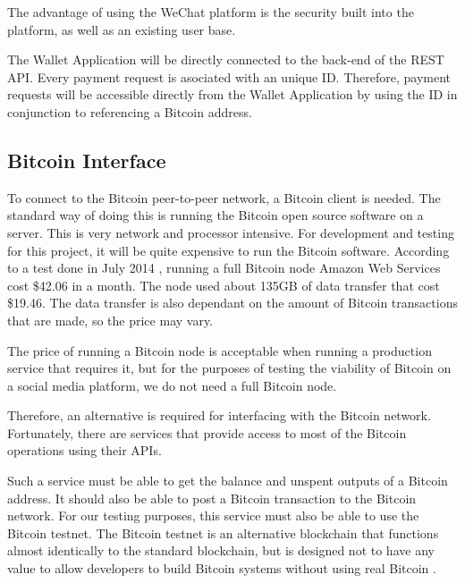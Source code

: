 The advantage of using the WeChat platform is the security built into the platform, as well as an existing user base. 

The Wallet Application will be directly connected to the back-end of the REST API. Every payment request is asociated with an unique ID. Therefore, payment requests will be accessible directly from the Wallet Application by using the ID in conjunction to referencing a Bitcoin address. 

\subsection{Bitcoin Interface}
\label{sct:bitcoin_interface}

To connect to the Bitcoin peer-to-peer network, a Bitcoin client is needed. The standard way of doing this is running the Bitcoin open source software on a server. This is very network and processor intensive. For development and testing for this project, it will be quite expensive to run the Bitcoin software. According to a test done in July 2014 \cite{Halliday}, running a full Bitcoin node Amazon Web Services cost \$42.06 in a month. The node used about 135GB of data transfer that cost \$19.46. The data transfer is also dependant on the amount of Bitcoin transactions that are made, so the price may vary.

The price of running a Bitcoin node is acceptable when running a production service that requires it, but for the purposes of testing the viability of Bitcoin on a social media platform, we do not need a full Bitcoin node.

 Therefore, an alternative is required for interfacing with the Bitcoin network. Fortunately, there are services that provide access to most of the Bitcoin operations using their APIs. 

Such a service must be able to get the balance and unspent outputs of a Bitcoin address. It should also be able to post a Bitcoin transaction to the Bitcoin network. For our testing purposes, this service must also be able to use the Bitcoin testnet. The Bitcoin testnet is an alternative blockchain that functions almost identically to the standard blockchain, but is designed not to have any value to allow developers to build Bitcoin systems without using real Bitcoin \cite{testnet}. 



